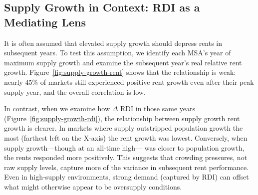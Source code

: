 \documentclass[APA,Times1COL]{WileyNJDv5} %
\begin{document}
\subsection{Supply Growth in Context: RDI as a Mediating Lens}
It is often assumed that elevated supply growth should depress rents in subsequent years. To test this assumption, we identify each MSA's year of maximum supply growth and examine the subsequent year’s real relative rent growth. Figure~\ref{fig:supply-growth-rent} shows that the relationship is weak: nearly 45\% of markets still experienced positive rent growth even after their peak supply year, and the overall correlation is low.

In contrast, when we examine how $\Delta$ RDI in those same years (Figure~\ref{fig:supply-growth-rdi}), the relationship between supply growth rent growth is clearer. In markets where supply outstripped population growth the most (farthest left on the X-axis) the rent growth was lowest. Conversely, when supply growth---though at an all-time high--- was closer to population growth, the rents responded more positively. This suggests that crowding pressures, not raw supply levels, capture more of the variance in subsequent rent performance. Even in high-supply environments, strong demand (captured by RDI) can offset what might otherwise appear to be oversupply conditions.
\end{document}
